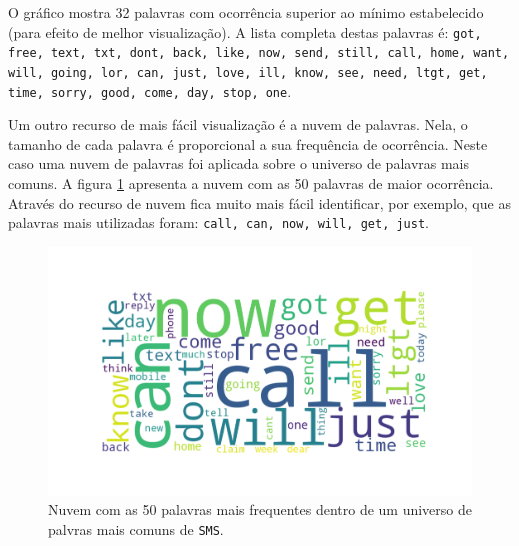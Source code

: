 \documentclass[a4paper,11pt]{article}
\begin{document}
O gráfico mostra 32 palavras com ocorrência superior ao mínimo estabelecido (para efeito de melhor
visualização). A lista completa destas palavras é: \texttt{got, free, text, txt, dont, back, 
like, now, send, still, call, home, want, will, going, lor, can, just, love, ill, know, see, need, 
ltgt, get, time, sorry, good, come, day, stop, one}.

Um outro recurso de mais fácil visualização é a nuvem de palavras. Nela, o tamanho de cada palavra 
é proporcional a sua frequência de ocorrência. Neste caso uma nuvem de palavras foi aplicada sobre 
o universo de palavras mais comuns. A figura \ref{fig:wordcloud} apresenta a nuvem com as 50 palavras 
de maior ocorrência. Através do recurso de nuvem fica muito mais fácil identificar, por exemplo,
que as palavras mais utilizadas foram: \texttt{call, can, now, will, get, just}.


\begin{figure}[htbp]
    \centering
    \includegraphics[width=\textwidth]{word_cloud.png}
    \caption[Figura simples]{Nuvem com as 50 palavras mais frequentes dentro de um universo de 
    palvras mais comuns de \texttt{SMS}.}
    \label{fig:wordcloud}
\end{figure}


 
\end{document}
